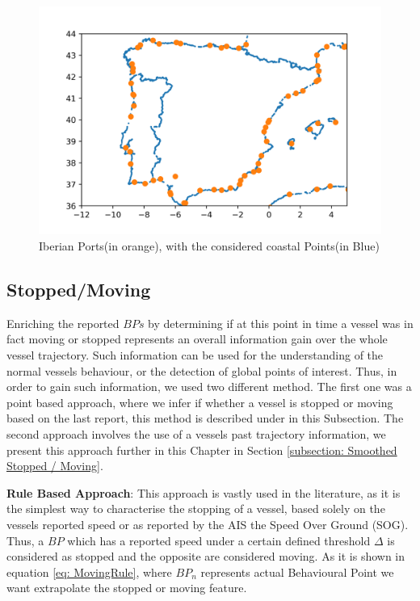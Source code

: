 \begin{figure}[H]
	\centering
	\includegraphics[scale = .9]{figures/Ch4/ports.png}
    \caption{Iberian Ports(in orange), with the considered coastal Points(in Blue)}
    \label{fig: 4 Ports}
\end{figure}

\subsection{Stopped/Moving}
\label{subsection: Stopped/Moving}
Enriching the reported $BPs$ by determining if at this point in time a vessel was in fact moving or stopped represents an overall information gain over the whole vessel trajectory. Such information can be used for the understanding of the normal vessels behaviour, or the detection of global points of interest.
Thus, in order to gain such information, we used two different method. The first one was a point based approach, where we infer if whether a vessel is stopped or moving based on the last report, this method is described under in this Subsection. The second approach involves the use of a vessels past trajectory information, we present this approach further in this Chapter in Section \ref{subsection: Smoothed Stopped / Moving}.

\textbf{Rule Based Approach}:
This approach is vastly used in the literature, as it is the simplest way to characterise the stopping of a vessel, based solely on the vessels reported speed or as reported by the AIS the Speed Over Ground (SOG). Thus, a $BP$ which has a reported speed under a certain defined threshold $\Delta$ is considered as stopped and the opposite are considered moving. As it is shown in equation \ref{eq: MovingRule}, where $BP_n$ represents actual Behavioural Point we want extrapolate the stopped or moving feature.

